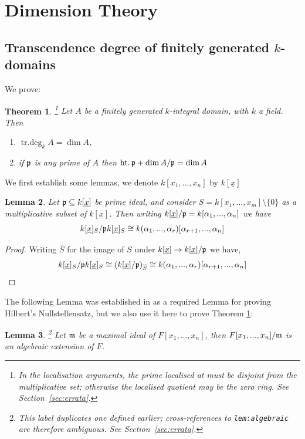 \documentclass[12pt]{article}
\theoremstyle{plain}
\newtheorem{thm}{Theorem}[subsection] %
\newtheorem{lemma}[thm]{Lemma}
\theoremstyle{definition}
\begin{document}
\section{Dimension Theory}
\subsection{Transcendence degree of finitely generated $k$-domains}
We prove:
\begin{thm}
\label{thm:onepointeight}\footnote{In the localisation arguments, the prime localised at must be disjoint from the multiplicative set; otherwise the localised quotient may be the zero ring. See Section~\ref{sec:errata}.}
Let $A$ be a finitely generated $k$-integral domain, with $k$ a field. Then
\begin{enumerate}
    \item\label{thm:onepointeighta} $\operatorname{tr.deg}_kA = \operatorname{dim}A$,
    \item\label{thm:onepointeightb} if $\frak{p}$ is any prime of $A$ then $\operatorname{ht.}\frak{p} + \operatorname{dim}A/\frak{p} = \operatorname{dim}A$
\end{enumerate}
\end{thm}
We first establish some lemmas, we denote $k[x_1,...,x_n]$ by $k[\underline{x}]$
\begin{lemma}
\label{lem:notationdance}
Let $\frak{p} \subseteq k[\underline{x}]$ be prime ideal, and consider $S = k[x_1,...,x_m]\setminus\lbrace 0 \rbrace$ as a multiplicative subset of $k[\underline{x}]$. Then writing $k[\underline{x}]/\frak{p} = k[\alpha_1,...,\alpha_n]$ we have
\[k[\underline{x}]_S/\frak{p}k[\underline{x}]_S \cong k(\alpha_1,...,\alpha_r)[\alpha_{r+1},...,\alpha_n]\]
\end{lemma}
\begin{proof}
Writing $\overline{S}$ for the image of $S$ under $k[\underline{x}] \to k[\underline{x}]/\frak{p}$ we have,
\[k[\underline{x}]_S/\frak{p}k[\underline{x}]_S \cong (k[\underline{x}]/\frak{p})_{\overline{S}} \cong k(\alpha_1,...,\alpha_r)[\alpha_{r+1},...,\alpha_n]\]
\end{proof}
The following Lemma was established in \cite{com_alg_notes} as a required Lemma for proving Hilbert's Nullstellensatz, but we also use it here to prove Theorem \ref{thm:onepointeight}:
\begin{lemma}
\label{lem:algebraic}\footnote{This label duplicates one defined earlier; cross-references to \texttt{lem:algebraic} are therefore ambiguous. See Section~\ref{sec:errata}.}
Let $\frak{m}$ be a maximal ideal of $F[x_1,...,x_n]$, then $F[x_1,...,x_n]/\frak{m}$ is an algebraic extension of $F$.
\end{lemma}
\end{document}
